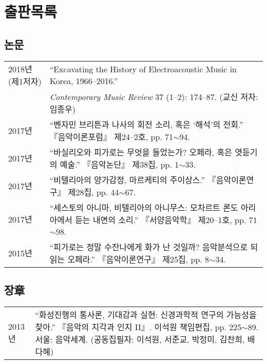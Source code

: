 \documentclass[dvipdfmx,a4paper]{article}
\begin{document}
  \section*{\normalsize 출판목록}

  \subsection*{\small 논문}
  \hspace*{-0.25cm}
  \begin{tabular}{p{3.0cm} p{11cm}}
    2018년(제1저자) & “Excavating the History of Electroacoustic Music in Korea,
    1966–2016.”\\
    & \textit{Contemporary Music Review} 37 (1–2): 174–87. (교신 저자:
    임종우)\\[2mm]
    
    2017년 & “벤자민 브리튼과 나사의 회전 소리, 혹은 ‘해석’의 전회.” 『음악이론포럼』 제24--2호, pp. 71$\sim$94.\\[2mm]
    
    2017년 & “바실리오와 피가로는 무엇을 들었는가? 오페라, 혹은 엿듣기의 예술.” 『음악논단』 제38집, pp. 1$\sim$33.\\[2mm]
    
    2017년 & “비텔리아의 양가감정, 마르케티의 주이상스.” 『음악이론연구』 제28집, pp. 44$\sim$67.\\[2mm]
    
    2017년 & “세스토의 아니마, 비텔리아의 아니무스: 모차르트 론도 아리아에서 듣는 내면의 소리.” 『서양음악학』 제20--1호, pp. 71$\sim$98.\\[2mm]
    
    2015년 & “피가로는 정말 수잔나에게 화가 난 것일까? 음악분석으로 되읽는 오페라.” 『음악이론연구』 제25집, pp. 8$\sim$34.
  \end{tabular}
  
  \subsection*{\small 장章}
  \hspace*{-0.25cm}
  \begin{tabular}{p{3.0cm} p{11.0cm}}
    2013년 & “화성진행의 통사론, 기대감과 실현: 신경과학적 연구의 가능성을 찾아.” 『음악의 지각과 인지 II』. 이석원 책임편집, pp. 225$\sim$89. 서울: 음악세계. (공동집필자: 이석원, 서준교, 박정미, 김찬희, 배다혜)
  \end{tabular}
  
\end{document}
